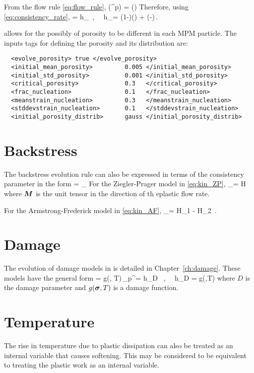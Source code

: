 From the flow rule \eqref{eq:flow_rule},
\Beq
  \Tr(\dot{\BVeps}^p) = \dot{\lambda}\Tr(\BM)
\Eeq
Therefore, using \eqref{eq:consistency_rate},
\Beq
  \dot{\phi} = \dot{\lambda} h_\phi ~,~~
    h_\phi = (1-\phi)\Tr(\BM) + 
             \exp\left(-\Half {}\right)\,.
\Eeq

\Vaango allows for the possibly of porosity to be different in each MPM particle.
The inputs tags for defining the porosity and its distribution are:
\lstset{language=XML}
\begin{lstlisting}
  <evolve_porosity> true </evolve_porosity>
  <initial_mean_porosity>         0.005 </initial_mean_porosity>
  <initial_std_porosity>          0.001 </initial_std_porosity>
  <critical_porosity>             0.3   </critical_porosity>
  <frac_nucleation>               0.1   </frac_nucleation>
  <meanstrain_nucleation>         0.3   </meanstrain_nucleation>
  <stddevstrain_nucleation>       0.1   </stddevstrain_nucleation>
  <initial_porosity_distrib>      gauss </initial_porosity_distrib>
\end{lstlisting}

\section{Backstress}
The backstress evolution rule can also be expressed in terms of the consistency
parameter in the form
\Beq
   \dot{\Bbeta} = \dot{\lambda} \Bh_\beta
\Eeq
For the Ziegler-Prager model in \eqref{eq:kin_ZP},
\Beq
  \Bh_\beta =  \beta H \BM
\Eeq
where $\boldsymbol{M}$ is the unit tensor in the direction of th eplastic flow rate.

For the Armstrong-Frederick model in \eqref{eq:kin_AF},
\Beq
  \Bh_\beta =  \beta H_1 \BM - \beta H_2 \Bbeta \,.
\Eeq

\section{Damage}
The evolution of damage models in \Vaango is detailed in Chapter~\ref{ch:damage}.
These models have the general form
\Beq
   = g(\Bsig, T)\,\dot{\Veps}_p^\Teq  = \dot{\lambda} h_D ~,~~ h_D = g(\Bsig,T)
\Eeq
where $D$ is the damage parameter and $g(\boldsymbol{\sigma}, T)$ is a damage function.

\section{Temperature}
The rise in temperature due to plastic dissipation can also be treated as an
internal variable that causes softening.  This may be considered to
be equivalent to treating the plastic work as an internal variable.

